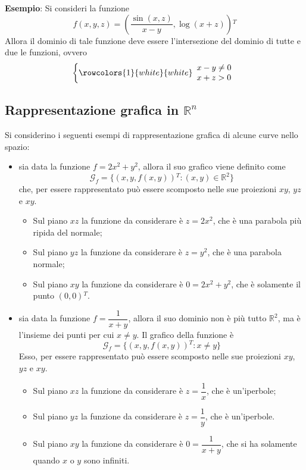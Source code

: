 \documentclass[a4paper]{extarticle}
\begin{document}
\vspace{1em}
\noindent
\textbf{Esempio}: Si consideri la funzione
\[f(x,y,z) = \left(\frac{\sin(x,z)}{x-y}, \log(x+z)\right){^T}\]
Allora il dominio di tale funzione deve essere l'intersezione del dominio di tutte e due le funzioni, ovvero
\[
    \left\{
    \rowcolors{1}{white}{white}
    \begin{array}{l}
        x-y \neq 0\\
        x+z > 0
    \end{array}
    \right.
\]

\vspace{1em}
\noindent
\subsection{Rappresentazione grafica in $\mathbb{R}^n$}
Si considerino i seguenti esempi di rappresentazione grafica di alcune curve nello spazio:
\begin{itemize}
    \item sia data la funzione $f=2x^2+y^2$, allora il suo grafico viene definito come
    \[\mathcal{G}_f = \{(x,y,f(x,y)){^T} : (x,y) \in \mathbb{R}^2\}\]
    che, per essere rappresentato può essere scomposto nelle sue proiezioni $xy$, $yz$ e $xy$.
    \begin{itemize}
        \item Sul piano $xz$ la funzione da considerare è $z=2x^2$, che è una parabola più ripida del normale;
        \item Sul piano $yz$ la funzione da considerare è $z=y^2$, che è una parabola normale;
        \item Sul piano $xy$ la funzione da considerare è $0=2x^2+y^2$, che è solamente il punto $(0,0){^T}$.
    \end{itemize}

    \item sia data la funzione $f=\dfrac{1}{x+y}$, allora il suo dominio non è più tutto $\mathbb{R}^2$, ma è l'insieme dei punti per cui $x \neq y$. Il grafico della funzione è
    \[\mathcal{G}_f = \{(x,y,f(x,y)){^T} : x \neq y\}\]
    Esso, per essere rappresentato può essere scomposto nelle sue proiezioni $xy$, $yz$ e $xy$.
    \begin{itemize}
        \item Sul piano $xz$ la funzione da considerare è $z=\dfrac{1}{x}$, che è un'iperbole;
        \item Sul piano $yz$ la funzione da considerare è $z=\dfrac{1}{y}$, che è un'iperbole.
        \item Sul piano $xy$ la funzione da considerare è $0=\dfrac{1}{x+y}$, che si ha solamente quando $x$ o $y$ sono infiniti.
    \end{itemize}
\end{itemize}
\end{document}
